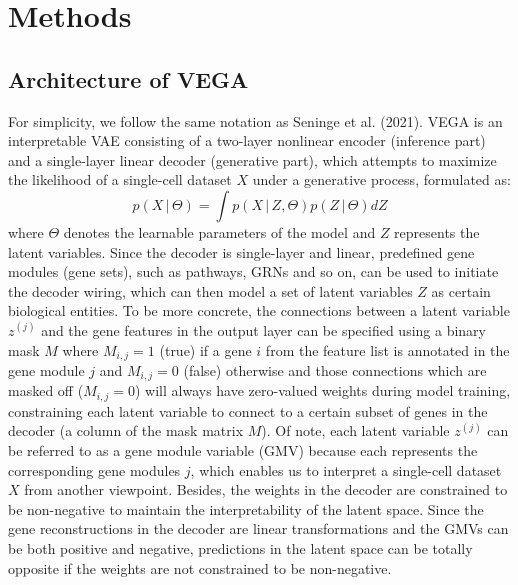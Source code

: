 \chapter{Methods}
\section{Architecture of VEGA}\label{methods:model}
For simplicity, we follow the same notation as Seninge et al. (2021). VEGA is an interpretable VAE consisting of a two-layer nonlinear encoder (inference part) and a single-layer linear decoder (generative part), which attempts to maximize the likelihood of a single-cell dataset $X$ under a generative process\cite{Seninge2021,Kingma2014,Lotfollahi2019}, formulated as:
\begin{equation}
    p(X\,|\,\Theta) = \int p(X\,|\,Z,\Theta)p(Z\,|\,\Theta)dZ
\end{equation}
where $\Theta$ denotes the learnable parameters of the model and $Z$ represents the latent variables. Since the decoder is single-layer and linear, predefined gene modules (gene sets), such as pathways, GRNs and so on, can be used to initiate the decoder wiring, which can then model a set of latent variables $Z$ as certain biological entities. To be more concrete, the connections between a latent variable $z^{(j)}$ and the gene features in the output layer can be specified using a binary mask $M$ where $M_{i,j} = 1$ (true) if a gene $i$ from the feature list is annotated in the gene module $j$ and $M_{i,j} = 0$ (false) otherwise and those connections which are masked off ($M_{i,j} = 0$) will always have zero-valued weights during model training, constraining each latent variable to connect to a certain subset of genes in the decoder (a column of the mask matrix $M$). Of note, each latent variable $z^{(j)}$ can be referred to as a gene module variable (GMV) because each represents the corresponding gene modules $j$, which enables us to interpret a single-cell dataset $X$ from another viewpoint. Besides, the weights in the decoder are constrained to be non-negative to maintain the interpretability of the latent space. Since the gene reconstructions in the decoder are linear transformations and the GMVs can be both positive and negative, predictions in the latent space can be totally opposite if the weights are not constrained to be non-negative.

